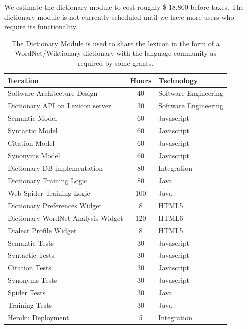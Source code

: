 \documentclass[12pt]{article}
\begin{document}
We estimate the dictionary module to cost roughly \$ 18,800 before taxes. The dictionary module is not currently scheduled until we have more users who require its functionality.
\label{module-dictionary}
\begin{table}[htbp]
\begin{center}
  \begin{tabular}{ | lcl | }
\hline

Iteration&  Hours&  Technology  \\
\hline
Software Architecture Design& 40& Software Engineering  \\ 
Dictionary API on Lexicon server& 30& Software Engineering\\ 
Semantic Model& 60& Javascript  \\ 
Syntactic Model&  60& Javascript  \\ 
Citation Model& 60& Javascript  \\ 
Synonyms Model& 60& Javascript  \\ 
Dictionary DB implementation& 80& Integration \\ 
Dictionary Training Logic&  80& Java  \\ 
Web Spider Training Logic&  100&  Java  \\ 
Dictionary Preferences Widget&  8&  HTML5 \\ 
Dictionary WordNet Analysis Widget& 120&  HTML6 \\ 
Dialect Profile Widget& 8&  HTML5 \\ 
Semantic Tests& 30& Javascript  \\ 
Syntactic Tests&  30&  Javascript \\ 
Citation Tests&          30&  Javascript \\ 
Synonyms Tests& 30&  Javascript \\ 
Spider Tests& 30& Java \\ 
Training Tests& 30& Java  \\ 
Heroku Deployment&  5&  Integration \\ 
\hline
  \end{tabular}
 \caption{The Dictionary Module is used to share the lexicon in the form of a WordNet/Wiktionary dictionary with the language community as required by some grants.}
  \label{tab:dictionary}
  \end{center}
\end{table}


\newpage
\end{document}
